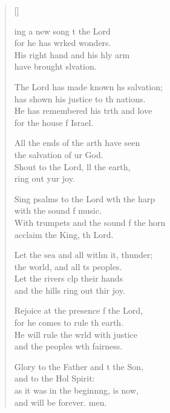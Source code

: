 \settowidth{\versewidth}{With trumpets and the sound of the horn *}
\begin{verse}[\versewidth]
  \begin{patverse}
ing a new song t the Lord\Med\\
for he has wrked wonders.\\
His right hand and his hly arm\Med\\
have brought slvation.

The Lord has made known h\pointup{\i}s salvation;\Med\\
has shown his justice to th nations.\\
He has remembered his trth and love\Med\\
for the house f Israel.

All the ends of the arth have seen\Med\\
the salvation of ur God.\\
Shout to the Lord, ll the earth,\Med\\
ring out yur joy.

Sing psalms to the Lord w\pointup{\i}th the harp\Med\\
with the sound f music.\\
With trumpets and the sound f the horn\Med\\
acclaim the King, th Lord.

Let the sea and all with\pointup{\i}n it, thunder;\Med\\
the world, and all \pointup{\i}ts peoples.\\
Let the rivers clp their hands\Med\\
and the hills ring out thir joy.

Rejoice at the presence f the Lord,\Med\\
for he comes to rule th earth.\\
He will rule the wrld with justice\Med\\
and the peoples w\pointup{\i}th fairness.

Glory to the Father and t the Son,\Med\\
and to the Hol Spirit:\\
as it was in the beginn\pointup{\i}ng, is now,\Med\\
and will be forever. men. 
  \end{patverse}
\end{verse}
